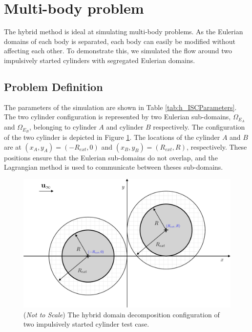 	
\section{Multi-body problem}
\label{sec:vvhm-mb}

The hybrid method is ideal at simulating multi-body problems. As the Eulerian domains of each body is separated, each body can easily be modified without affecting each other. To demonstrate this, we simulated the flow around two impulsively started cylinders with segregated Eulerian domains. 

\subsection{Problem Definition}

The parameters of the simulation are shown in Table \ref{tab:h_ISCParameters}. The two cylinder configuration is represented by two Eulerian sub-domains, $\Omega_{E_{A}}$ and $\Omega_{E_B}$, belonging to cylinder $A$ and cylinder $B$ respectively. The configuration of the two cylinder is depicted in Figure \ref{fig:hmisc_dd-crop}. The locations of the cylinder $A$ and $B$ are at $(x_A,y_A) = (-R_{ext},0)$ and $(x_B,y_B) = (R_{ext},R)$, respectively. These positions ensure that the Eulerian sub-domains do not overlap, and the Lagrangian method is used to communicate between theses sub-domains.

	\begin{figure}[H]
	\centering
	\includegraphics[width=0.6\linewidth]{./figures/validation/multipleCylinder/hmisc_dd-crop.pdf}
	\caption{(\textit{Not to Scale}) The hybrid domain decomposition configuration of two impulsively started cylinder test case. }
	\label{fig:hmisc_dd-crop}
	\end{figure}

